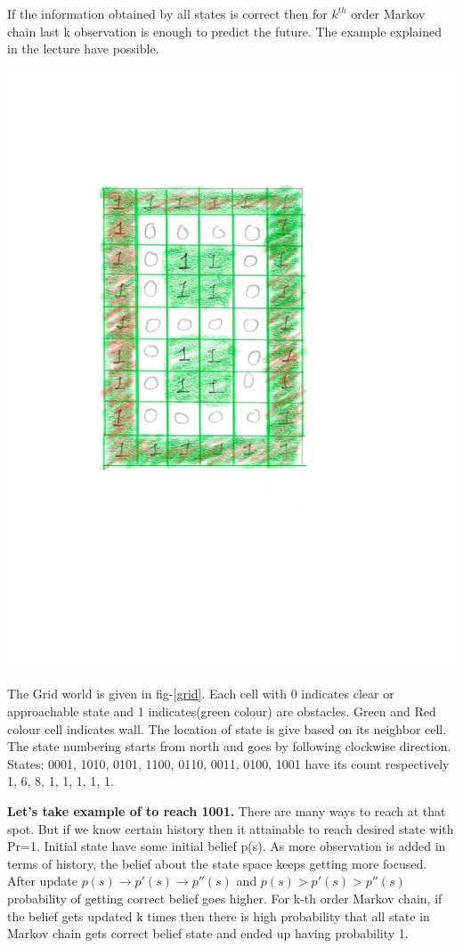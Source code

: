 \documentclass[solution,addpoints,12pt]{exam}
\begin{document}
\begin{questions}
\begin{solution}
If the information obtained by all states is correct then for $k^{th}$ order Markov chain last k observation is enough to predict the future.  
The example explained in the lecture have possible. 
\begin{center}
	\includegraphics[trim={10cm 20cm 19cm 14cm},clip,scale=0.2]{belief.png}\label{grid}
\end{center}

The Grid world is given in fig-\ref{grid}. Each cell with 0 indicates clear or approachable state and 1 indicates(green colour) are obstacles. Green and Red colour cell indicates wall. The location of state is give based on its neighbor cell. The state numbering starts from north and goes by following clockwise direction. States: 0001, 1010, 0101, 1100, 0110, 0011, 0100, 1001 have its count respectively 1, 6, 8, 1, 1, 1, 1, 1.

\textbf{Let's take example of to reach 1001.}  There are many ways to reach at that spot. But if we know certain history then it attainable to reach desired state with Pr=1. Initial state have some initial belief p(s). As more observation is added in terms of history, the belief about the state space keeps getting more focused. After update $p(s)\rightarrow p'(s) \rightarrow p''(s)$ and $p(s)> p'(s)> p''(s)$ probability of getting correct belief goes higher. For k-th order Markov chain, if the belief gets updated k times then there is high probability that all state in Markov chain gets correct belief state and ended up having probability 1.


\end{solution}
\end{questions}
\end{document}
